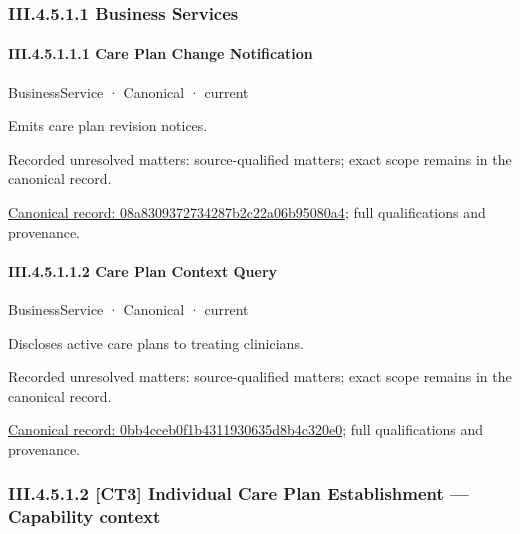 \subsubsection*{III.4.5.1.1 Business Services}
\label{navigation:III.4.5.1.1}

\paragraph*{III.4.5.1.1.1 Care Plan Change Notification}
\label{navigation:III.4.5.1.1.1}

\label{element:08a8309372734287b2c22a06b95080a4}
{\small BusinessService · Canonical · current}\par

Emits care plan revision notices.


{\small Recorded unresolved matters: source-qualified matters; exact scope remains in the canonical record.}\par
{\footnotesize \href{../../../../continuum/business/business-service/08a8309372734287b2c22a06b95080a4.md}{Canonical record: 08a8309372734287b2c22a06b95080a4}; full qualifications and provenance.}\par
\paragraph*{III.4.5.1.1.2 Care Plan Context Query}
\label{navigation:III.4.5.1.1.2}

\label{element:0bb4cceb0f1b4311930635d8b4c320e0}
{\small BusinessService · Canonical · current}\par

Discloses active care plans to treating clinicians.


{\small Recorded unresolved matters: source-qualified matters; exact scope remains in the canonical record.}\par
{\footnotesize \href{../../../../continuum/business/business-service/0bb4cceb0f1b4311930635d8b4c320e0.md}{Canonical record: 0bb4cceb0f1b4311930635d8b4c320e0}; full qualifications and provenance.}\par
\subsubsection*{III.4.5.1.2 [CT3] Individual Care Plan Establishment — Capability context}
\label{navigation:III.4.5.1.2}


